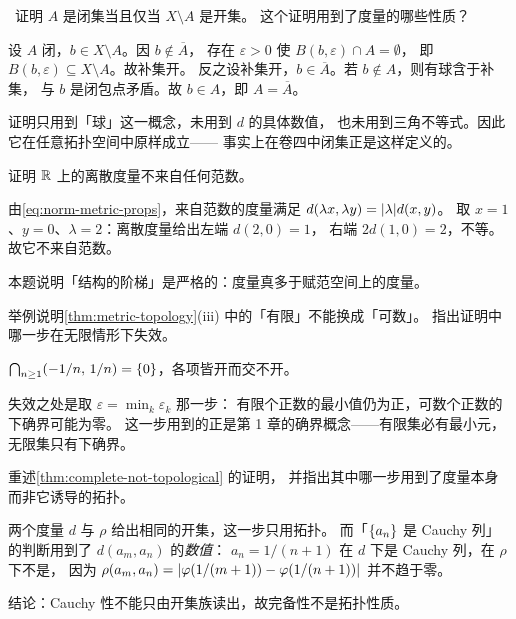 \begin{exercise}[结构]
  \label{exr:open-iff-complement-closed}
  \needlater\
  证明 \(A\) 是闭集当且仅当 \(X \setminus A\) 是开集。
  这个证明用到了度量的哪些性质？
  \begin{solution}
    设 \(A\) 闭，\(b \in X\setminus A\)。因 \(b \notin \overline{A}\)，
    存在 \(\varepsilon>0\) 使 \(B(b,\varepsilon) \cap A = \emptyset\)，
    即 \(B(b,\varepsilon) \subseteq X\setminus A\)。故补集开。
    反之设补集开，\(b \in \overline{A}\)。若 \(b \notin A\)，则有球含于补集，
    与 \(b\) 是闭包点矛盾。故 \(b \in A\)，即 \(A = \overline{A}\)。

    证明只用到「球」这一概念，未用到 \(d\) 的具体数值，
    也未用到三角不等式。因此它在任意拓扑空间中原样成立——
    事实上在卷四中闭集正是这样定义的。
  \end{solution}
\end{exercise}

\begin{exercise}[结构]
  \label{exr:not-from-norm}
  证明 \(\mathbb{R}\) 上的离散度量不来自任何范数。
  \begin{solution}
    由\cref{eq:norm-metric-props}，来自范数的度量满足
    \(d(\lambda x,\lambda y) = \lvert\lambda\rvert d(x,y)\)。
    取 \(x=1\)、\(y=0\)、\(\lambda=2\)：离散度量给出左端 \(d(2,0)=1\)，
    右端 \(2 d(1,0)=2\)，不等。故它不来自范数。

    本题说明「结构的阶梯」是严格的：度量真多于赋范空间上的度量。
  \end{solution}
\end{exercise}

\begin{exercise}[结构]
  \label{exr:infinite-intersection}
  举例说明\cref{thm:metric-topology}(iii) 中的「有限」不能换成「可数」。
  指出证明中哪一步在无限情形下失效。
  \begin{solution}
    \(\bigcap_{n\ge 1}(-1/n,\,1/n) = \left\{0\right\}\)，各项皆开而交不开。

    失效之处是取 \(\varepsilon = \min_{k}\varepsilon_{k}\) 那一步：
    有限个正数的最小值仍为正，可数个正数的下确界可能为零。
    这一步用到的正是第 1 章的确界概念——有限集必有最小元，无限集只有下确界。
  \end{solution}
\end{exercise}

\begin{exercise}[结构]
  \label{exr:completeness-not-topological}
  重述\cref{thm:complete-not-topological} 的证明，
  并指出其中哪一步用到了度量本身而非它诱导的拓扑。
  \begin{solution}
    两个度量 \(d\) 与 \(\rho\) 给出相同的开集，这一步只用拓扑。
    而「\(\{a_{n}\}\) 是 Cauchy 列」的判断用到了 \(d(a_{m},a_{n})\) 的\emph{数值}：
    \(a_{n}=1/(n+1)\) 在 \(d\) 下是 Cauchy 列，在 \(\rho\) 下不是，
    因为 \(\rho(a_{m},a_{n}) = \lvert\varphi(1/(m+1))-\varphi(1/(n+1))\rvert\) 并不趋于零。

    结论：Cauchy 性不能只由开集族读出，故完备性不是拓扑性质。
  \end{solution}
\end{exercise}

